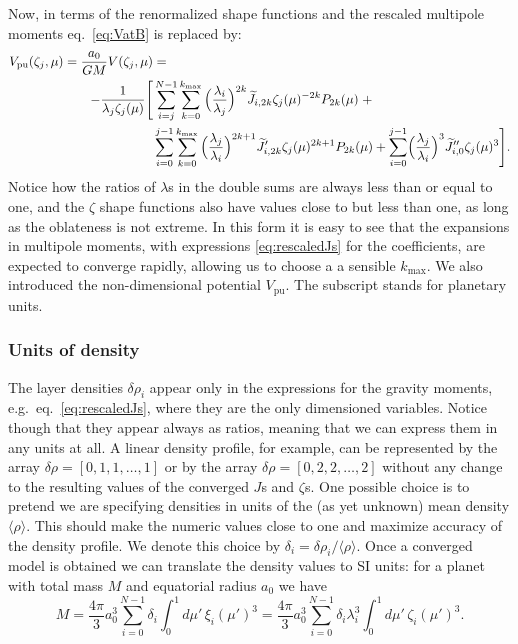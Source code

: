 \documentclass[amsmath,amsfonts,rmp,letterpaper]{revtex4}
\newcommand{\sub}[1]{_{\text{#1}}} %
\newcommand{\mean}[1]{\langle #1 \rangle} %
\newcommand{\ptk}{P_{2k}}
\newcommand{\dro}{\delta\rho}
\newcommand{\mupint}{\int_{0}^{1}d\mu'\,}
\newcommand{\kmax}{k\sub{max}}
\newcommand{\Jtil}{\widetilde{J}}
\newcommand{\sumkmax}{\sum_{k=0}^{\kmax}}
\begin{document}
Now, in terms of the renormalized shape functions and the rescaled multipole
moments eq.~\eqref{eq:VatB} is replaced by:
\begin{equation}\label{eq:VpuatB}
\begin{split}
V\sub{pu}(\zeta_j,\mu) = \frac{a_0}{GM} V(\zeta_j,\mu) &= \\ 
-\frac{1}{\lambda_j\zeta_j(\mu)}\Biggl[
&\sum_{i=j}^{N-1}\sumkmax{}\Bigl(\frac{\lambda_i}{\lambda_j}\Bigr)^{2k}
\Jtil_{i,2k}\zeta_j(\mu)^{-2k}\ptk(\mu)\; + \\
&\sum_{i=0}^{j-1}\sumkmax{}\Bigl(\frac{\lambda_j}{\lambda_i}\Bigr)^{2k+1}
\Jtil'_{i,2k}\zeta_j(\mu)^{2k+1}\ptk(\mu) + 
\sum_{i=0}^{j-1}\Bigl(\frac{\lambda_j}{\lambda_i}\Bigr)^3
\Jtil''_{i,0}\zeta_j(\mu)^3
\Biggr].
\end{split}
\end{equation}
Notice how the ratios of $\lambda$s in the double sums are always less than or
equal to one, and the $\zeta$ shape functions also have values close to but less
than one, as long as the oblateness is not extreme. In this form it is easy to see
that the expansions in multipole moments, with expressions \eqref{eq:rescaledJs}
for the coefficients, are expected to converge rapidly, allowing us to choose a a
sensible $\kmax$. We also introduced the non-dimensional potential $V\sub{pu}$.
The subscript stands for planetary units.

\subsubsection{Units of density}

The layer densities $\dro_i$ appear only in the expressions for the gravity
moments, e.g.~eq.~\eqref{eq:rescaledJs}, where they are the only dimensioned
variables. Notice though that they appear always as ratios, meaning that we can
express them in any units at all. A linear density profile, for example, can be
represented by the array $\dro=[0,1,1,\ldots,1]$ or by the array
$\dro=[0,2,2,\ldots,2]$ without any change to the resulting values of the
converged $J$s and $\zeta$s. One possible choice is to pretend we are specifying
densities in units of the (as yet unknown) mean density $\mean{\rho}$. This should
make the numeric values close to one and maximize accuracy of the density profile.
We denote this choice by $\delta_i=\dro_i/\mean{\rho}$. Once a converged model is
obtained we can translate the density values to SI units: for a planet with total
mass $M$ and equatorial radius $a_0$ we have
\begin{equation}
M =
\frac{4\pi}{3}a_0^3\sum_{i=0}^{N-1}\delta_i\mupint\xi_i(\mu')^3 = 
\frac{4\pi}{3}a_0^3\sum_{i=0}^{N-1}\delta_i\lambda_i^3\mupint\zeta_i(\mu')^3.
\end{equation}
\end{document}
